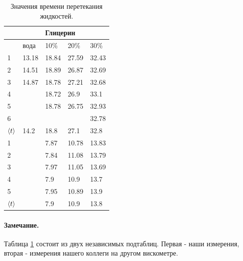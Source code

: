 \documentclass[a4paper, 12pt]{article}
\begin{document}
\begin{enumerate}
        \begin{table}[H]
          \center
          \begin{tabular}{|l|l|l|l|l|}
            \hline
                       &       & \multicolumn{2}{l}{Глицерин} &               \\
            \hline
                       & вода  & 10\%                         & 20\%  & 30\%  \\
            \hline
            1          & 13.18 & 18.84                        & 27.59 & 32.43 \\
            2          & 14.51 & 18.89                        & 26.87 & 32.69 \\
            3          & 14.87 & 18.78                        & 27.21 & 32.68 \\
            4          &       & 18.72                        & 26.9  & 33.1  \\
            5          &       & 18.78                        & 26.75 & 32.93 \\
            6          &       &                              &       & 32.78 \\
            \hline
            $\left< t \right>$ & 14.2  & 18.8                         & 27.1  & 32.8  \\
            \hline
            \hline
            1          &       & 7.87                         & 10.78 & 13.83 \\
            2          &       & 7.84                         & 11.08 & 13.79 \\
            3          &       & 7.97                         & 11.05 & 13.69 \\
            4          &       & 7.9                          & 10.9  & 13.7  \\
            5          &       & 7.95                         & 10.89 & 13.9  \\
            \hline
            $\left< t \right>$ &       & 7.9                          & 10.9  & 13.8  \\
            \hline
          \end{tabular}
          \caption{Значения времени перетекания жидкостей. \label{table:2}}
        \end{table}

        \paragraph{Замечание.}
        Таблица \ref{table:2} состоит из двух независимых подтаблиц. Первая - наши
        измерения, вторая - измерения нашего коллеги на другом вискометре.\\


\end{enumerate}
\end{document}
